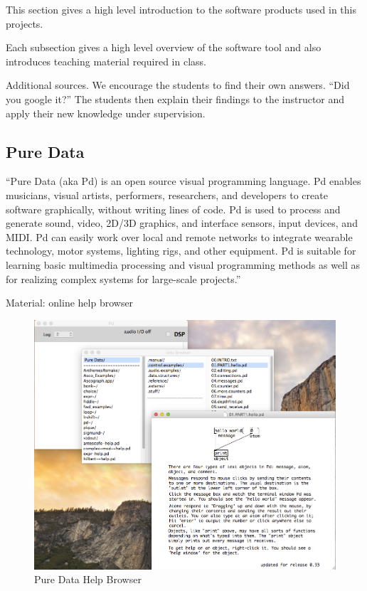\documentclass[onecolumn,nocopyrightspace,preprint]{sigplanconf}
\begin{document}
This section gives a high level introduction to the software products
used in this projects.

Each subsection gives a high level overview of the software tool and
also introduces teaching material required in class.

Additional sources. We encourage the students to find their own answers.
``Did you google it?''
The students then explain their findings to the instructor and apply their
new knowledge under supervision.

\subsection{Pure Data}

``Pure Data (aka Pd) is an open source visual programming language. Pd enables
musicians, visual artists, performers, researchers, and developers to create
software graphically, without writing lines of code. Pd is used to process
and generate sound, video, 2D/3D graphics, and interface sensors, input
devices, and MIDI. Pd can easily work over local and remote networks to
integrate wearable technology, motor systems, lighting rigs, and other
equipment. Pd is suitable for learning basic multimedia processing and
visual programming methods as well as for realizing complex systems for
large-scale projects.''~\cite{website:puredata}

Material: online help browser

\begin{figure}[ht]
    \centering
    \includegraphics[scale=0.4]{fig/pd-help-browser.png}
    \caption{Pure Data Help Browser}
    \label{fig:pd-help-browser}
\end{figure}
\end{document}
